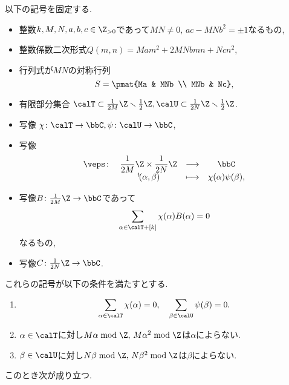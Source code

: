\documentclass[11pt,b5paper,oneside,lualatex]{ltjsarticle} %
\numberwithin{equation}{section} %
\begin{document}
\begin{prop} \label{prop:Gauss_sum_vanish}
	以下の記号を固定する. 
	\begin{itemize}
		\item 整数$ k, M, N, a, b, c \in \Z_{>0} $であって$ MN \neq 0, \, ac - MNb^2 = \pm 1 $なるもの, 
		\item 整数係数二次形式$ Q(m, n) = Mam^2 + 2MNbmn + Ncn^2 $,
		\item 行列式が$ MN $の対称行列
		\[
		S = \pmat{Ma & MNb \\ MNb & Nc},
		\]
		\item 有限部分集合	$ \calT \subset \frac{1}{2M}\Z \smallsetminus \frac{1}{2}\Z, \calU \subset \frac{1}{2N}\Z \smallsetminus \frac{1}{2}\Z $.
		\item 写像	$ \chi \colon \calT \to \bbC, \psi \colon \calU \to \bbC $,
		\item 写像
		\[
		\begin{array}{cccc}
			\veps \colon & \dfrac{1}{2M}\Z \times \dfrac{1}{2N}\Z & \longrightarrow & \bbC \\
			& {}^t\!(\alpha, \beta) & \longmapsto & \chi(\alpha) \psi(\beta),
		\end{array}
		\]
		\item 写像$ B \colon \frac{1}{2M}\Z \to \bbC $であって
		\begin{equation} \label{eq:B_vanish}
			\sum_{\alpha \in \calT + [k]} \chi(\alpha) B(\alpha) = 0
		\end{equation}
		なるもの, 
		\item 写像$ C \colon \frac{1}{2N}\Z \to \bbC $.
	\end{itemize}
	これらの記号が以下の条件を満たすとする. 
	\begin{enumerate}[label=(\alph*),ref=(\alph*)]
		\item \label{item:prop:Gauss_sum_vanish_zero}
		\[
		\sum_{\alpha \in \calT} \chi(\alpha) = 0, \quad
		\sum_{\beta \in \calU} \psi(\beta) = 0.
		\]
		\item \label{item:prop:Gauss_sum_vanish_chi}
		$ \alpha \in \calT $に対し$ M\alpha \bmod \Z, \, M\alpha^2 \bmod \Z $は$ \alpha $によらない. 
		\item \label{item:prop:Gauss_sum_vanish_psi}
		$ \beta \in \calU $に対し$ N\beta \bmod \Z, \, N\beta^2 \bmod \Z $は$ \beta $によらない. 
	\end{enumerate}
	このとき次が成り立つ. 
	\begin{enumerate}

\end{enumerate}
\end{prop}
\end{document}

